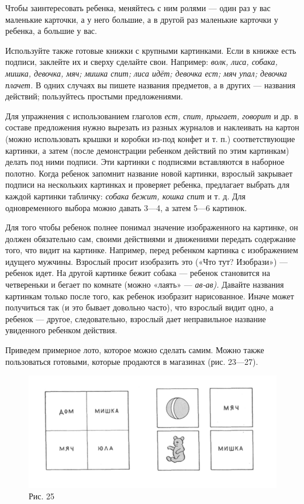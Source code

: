 \documentclass[a5paper]{book}
\renewcommand{\emph}[1]{\textit{#1}}
\begin{document}
Чтобы заинтересовать ребенка, меняйтесь с ним ролями --- один раз у вас
маленькие карточки, а у него большие, а в другой раз маленькие карточки
у ребенка, а большие у вас.

Используйте также готовые книжки с крупными картинками. Если в книжке
есть подписи, заклейте их и сверху сделайте свои. Например: \emph{волк,
лиса, собака, мишка, девочка, мяч; мишка спит; лиса идёт; девочка ест;
мяч упал; девочка плачет.} В одних случаях вы пишете названия предметов,
а в других --- названия действий; пользуйтесь простыми предложениями.

Для упражнения с использованием глаголов \emph{ест, спит, прыгает,
говорит} и др. в составе предложения нужно вырезать из разных журналов и
наклеивать на картон (можно использовать крышки и коробки из-под конфет
и т. п.) соответствующие картинки, а затем (после демонстрации ребенком
действий по этим картинкам) делать под ними подписи. Эти картинки с
подписями вставляются в наборное полотно. Когда ребенок запомнит
название новой картинки, взрослый закрывает подписи на нескольких
картинках и проверяет ребенка, предлагает выбрать для каждой картинки
табличку: \emph{собака бежит, кошка спит} и т. д. Для одновременного
выбора можно давать 3---4, а затем 5---6 картинок.

Для того чтобы ребенок полнее понимал значение изображенного на
картинке, он должен обязательно сам, своими действиями и движениями
передать содержание того, что видит на картинке. Например, перед
ребенком картинка с изображением идущего мужчины. Взрослый просит
изобразить это («Что тут? Изобрази») --- ребенок идет. На другой
картинке бежит собака --- ребенок становится на четвереньки и бегает по
комнате (можно «лаять» --- \emph{ав-ав).} Давайте названия картинкам
только после того, как ребенок изобразит нарисованное. Иначе может
получиться так (и это бывает довольно часто), что взрослый видит одно, а
ребенок --- другое, следовательно, взрослый дает неправильное название
увиденного ребенком действия.

Приведем примерное лото, которое можно сделать самим. Можно также
пользоваться готовыми, которые продаются в магазинах (рис. 23---27).

\begin{figure}
\centering
\includegraphics[width=\linewidth]{media/media/image22.png}
\caption*{Рис. 25}
\end{figure}
\end{document}
